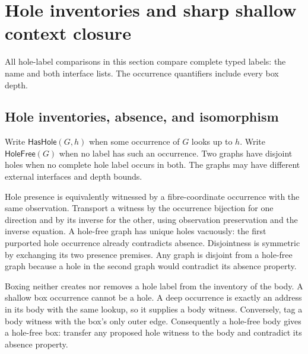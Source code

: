 \section{Hole inventories and sharp shallow context closure}
\label{sec:context-closure}
All hole-label comparisons in this section compare complete typed labels: the
name and both interface lists. The occurrence quantifiers include every box depth.

\subsection{Hole inventories, absence, and isomorphism}
\begin{definition}\label{term:hole-presence}
Write $\mathsf{HasHole}(G,h)$ when some occurrence of $G$ looks up to $h$.
Write $\mathsf{HoleFree}(G)$ when no label has such an occurrence. Two graphs
have disjoint holes when no complete hole label occurs in both. The graphs may
have different external interfaces and depth bounds.
\end{definition}
Hole presence is equivalently witnessed by a fibre-coordinate occurrence with
the same observation. Transport a witness by the occurrence bijection for one
direction and by its inverse for the other, using observation preservation and
the inverse equation.
A hole-free graph has unique holes vacuously: the first purported hole occurrence
already contradicts absence. Disjointness is symmetric by exchanging its two
presence premises. Any graph is disjoint from a hole-free graph because a hole
in the second graph would contradict its absence property.

Boxing neither creates nor removes a hole label from the inventory of the body.
A shallow box occurrence cannot be a hole. A deep occurrence is exactly an
address in its body with the same lookup, so it supplies a body witness. Conversely,
tag a body witness with the box's only outer edge. Consequently a hole-free body
gives a hole-free box: transfer any proposed hole witness to the body and contradict
its absence property.

